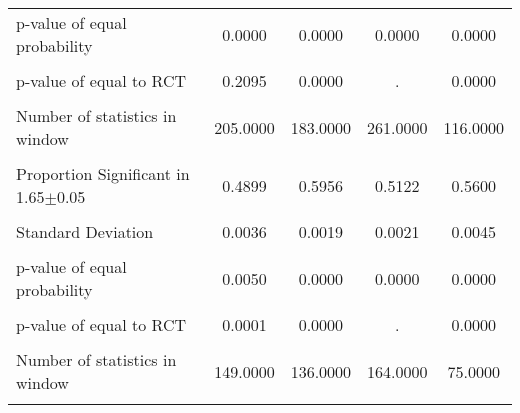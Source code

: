 {\begin{tabular}{l*{4}{c}}
p-value of equal probability&   0.0000         &   0.0000         &   0.0000         &   0.0000         \\
                &                  &                  &                  &                  \\
p-value of equal to RCT&   0.2095         &   0.0000         &        .         &   0.0000         \\
                &                  &                  &                  &                  \\
Number of statistics in window& 205.0000         & 183.0000         & 261.0000         & 116.0000         \\
                &                  &                  &                  &                  \\
\hline Proportion Significant in 1.65$\pm$0.05&   0.4899         &   0.5956         &   0.5122         &   0.5600         \\
                &                  &                  &                  &                  \\
Standard Deviation&   0.0036         &   0.0019         &   0.0021         &   0.0045         \\
                &                  &                  &                  &                  \\
p-value of equal probability&   0.0050         &   0.0000         &   0.0000         &   0.0000         \\
                &                  &                  &                  &                  \\
p-value of equal to RCT&   0.0001         &   0.0000         &        .         &   0.0000         \\
                &                  &                  &                  &                  \\
Number of statistics in window& 149.0000         & 136.0000         & 164.0000         &  75.0000         \\
                &                  &                  &                  &                  \\
\hline\hline
\end{tabular}
}
